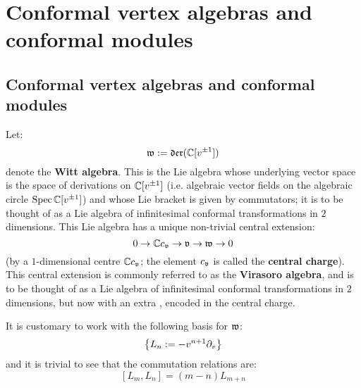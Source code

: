 \section{Conformal vertex algebras and conformal modules}
    \subsection{Conformal vertex algebras and conformal modules}
        Let:
            $$\mathfrak{w} := \mathfrak{der}( \mathbb{C}[v^{\pm 1}] )$$
        denote the \textbf{Witt algebra}. This is the Lie algebra whose underlying vector space is the space of derivations on $\mathbb{C}[v^{\pm 1}]$ (i.e. algebraic vector fields on the algebraic circle $\operatorname{Spec} \mathbb{C}[v^{\pm 1}]$) and whose Lie bracket is given by commutators; it is to be thought of as a Lie algebra of infinitesimal conformal transformations in $2$ dimensions. This Lie algebra has a unique non-trivial central extension:
            $$0 \to \mathbb{C} c_{\mathfrak{v}} \to \mathfrak{v} \to \mathfrak{w} \to 0$$
        (by a $1$-dimensional centre $\mathbb{C} c_{\mathfrak{v}}$; the element $c_{\mathfrak{v}}$ is called the \textbf{central charge}). This central extension is commonly referred to as the \textbf{Virasoro algebra}, and is to be thought of as a Lie algebra of infinitesimal conformal transformations in $2$ dimensions, but now with an extra , encoded in the central charge.

        It is customary to work with the following basis for $\mathfrak{w}$:
            $$\left\{ L_n := -v^{n + 1} \partial_v \right\}$$
        and it is trivial to see that the commutation relations are:
            $$[L_m, L_n] = (m - n) L_{m + n}$$
    
